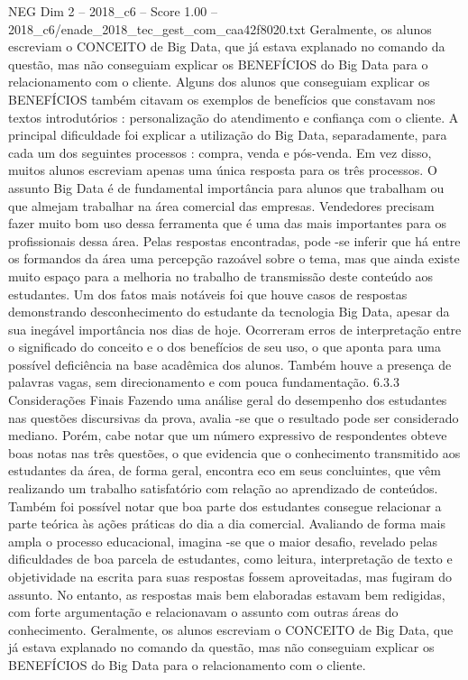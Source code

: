 \begin{textsample}{NEG Dim 2 – 2018\_c6 – Score 1.00 – 2018\_c6/enade\_2018\_tec\_gest\_com\_caa42f8020.txt}
Geralmente, os alunos escreviam o CONCEITO de Big Data, que já estava explanado no comando da questão, mas não conseguiam explicar os BENEFÍCIOS do Big Data para o relacionamento com o cliente.
Alguns dos alunos que conseguiam explicar os BENEFÍCIOS também citavam os exemplos de benefícios que constavam nos textos introdutórios : personalização do atendimento e confiança com o cliente.
A principal dificuldade foi explicar a utilização do Big Data, separadamente, para cada um dos seguintes processos : compra, venda e pós-venda.
Em vez disso, muitos alunos escreviam apenas uma única resposta para os três processos.
O assunto Big Data é de fundamental importância para alunos que trabalham ou que almejam trabalhar na área comercial das empresas.
Vendedores precisam fazer muito bom uso dessa ferramenta que é uma das mais importantes para os profissionais dessa área.
Pelas respostas encontradas, pode -se inferir que há entre os formandos da área uma percepção razoável sobre o tema, mas que ainda existe muito espaço para a melhoria no trabalho de transmissão deste conteúdo aos estudantes.
Um dos fatos mais notáveis foi que houve casos de respostas demonstrando desconhecimento do estudante da tecnologia Big Data, apesar da sua inegável importância nos dias de hoje.
Ocorreram erros de interpretação entre o significado do conceito e o dos benefícios de seu uso, o que aponta para uma possível deficiência na base acadêmica dos alunos.
Também houve a presença de palavras vagas, sem direcionamento e com pouca fundamentação. 6.3.3 Considerações Finais Fazendo uma análise geral do desempenho dos estudantes nas questões discursivas da prova, avalia -se que o resultado pode ser considerado mediano.
Porém, cabe notar que um número expressivo de respondentes obteve boas notas nas três questões, o que evidencia que o conhecimento transmitido aos estudantes da área, de forma geral, encontra eco em seus concluintes, que vêm realizando um trabalho satisfatório com relação ao aprendizado de conteúdos.
Também foi possível notar que boa parte dos estudantes consegue relacionar a parte teórica às ações práticas do dia a dia comercial.
Avaliando de forma mais ampla o processo educacional, imagina -se que o maior desafio, revelado pelas dificuldades de boa parcela de estudantes, como leitura, interpretação de texto e objetividade na escrita para suas respostas fossem aproveitadas, mas fugiram do assunto.
No entanto, as respostas mais bem elaboradas estavam bem redigidas, com forte argumentação e relacionavam o assunto com outras áreas do conhecimento.
Geralmente, os alunos escreviam o CONCEITO de Big Data, que já estava explanado no comando da questão, mas não conseguiam explicar os BENEFÍCIOS do Big Data para o relacionamento com o cliente.

\end{textsample}
